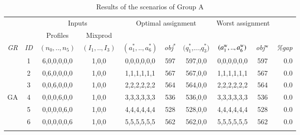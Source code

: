 \documentclass[review,12pt, 3p, times]{elsarticle}
\begin{document}
								
\setlength{\tabcolsep}{3pt}
\setcounter{table}{2}
\begin{longtable}{|c|c|c|c|c|c|c|c|c|r|}
	\hline
	& & \multicolumn{2}{c|}{Inputs} & \multicolumn{3}{c|}{Optimal assignment} & \multicolumn{2}{c|}{Worst assignment }& \\
	& \multicolumn{1}{c|}{ } & \multicolumn{1}{c|}{Profiles} & \multicolumn{1}{c|}{Mixprod}& \multicolumn{1}{c}{}  & \multicolumn{2}{c|}{} & \multicolumn{2}{c|}{}&\multicolumn{1}{c|}{}\\
	\it{GR} & \it{ID} & \multicolumn{1}{c|}{$(n_0,..,n_5)$} & \multicolumn{1}{c|}{$(I_1,..,I_3)$} & {$(a^*_1,..,a^*_6)$} & \it{obj}$^*$ & $(q^*_1$,...,$q^*_3)$ & {$(a^{\textsc{w}}_1,..,a^{\textsc{w}}_6)$} & \it{obj}$^{\textsc{w}}$ & \it{\%gap} \\ 
																										
	\hline
	        & 1       & 6,0,0,0,0,0                         & 1,0,0                               & 0,0,0,0,0,0          & 597          & 597,0,0               & 0,0,0,0,0,0                                & 597                     & 0.0        \\
	        & 2       & 0,6,0,0,0,0                         & 1,0,0                               & 1,1,1,1,1,1          & 567          & 567,0,0               & 1,1,1,1,1,1                                & 567                     & 0.0        \\
	        & 3       & 0,0,6,0,0,0                         & 1,0,0                               & 2,2,2,2,2,2          & 564          & 564,0,0               & 2,2,2,2,2,2                                & 564                     & 0.0        \\
	{GA}%
	        & 4       & 0,0,0,6,0,0                         & 1,0,0                               & 3,3,3,3,3,3          & 536          & 536,0,0               & 3,3,3,3,3,3                                & 536                     & 0.0        \\
	        & 5       & 0,0,0,0,6,0                         & 1,0,0                               & 4,4,4,4,4,4          & 528          & 528,0,0               & 4,4,4,4,4,4                                & 528                     & 0.0        \\
	        & 6       & 0,0,0,0,0,6                         & 1,0,0                               & 5,5,5,5,5,5          & 562          & 562,0,0               & 5,5,5,5,5,5                                & 562                     & 0.0        \\
	\hline
	\caption{Results of the scenarios of Group A}
	\label{tab:tr_ga}
\end{longtable}
					
\end{document}
